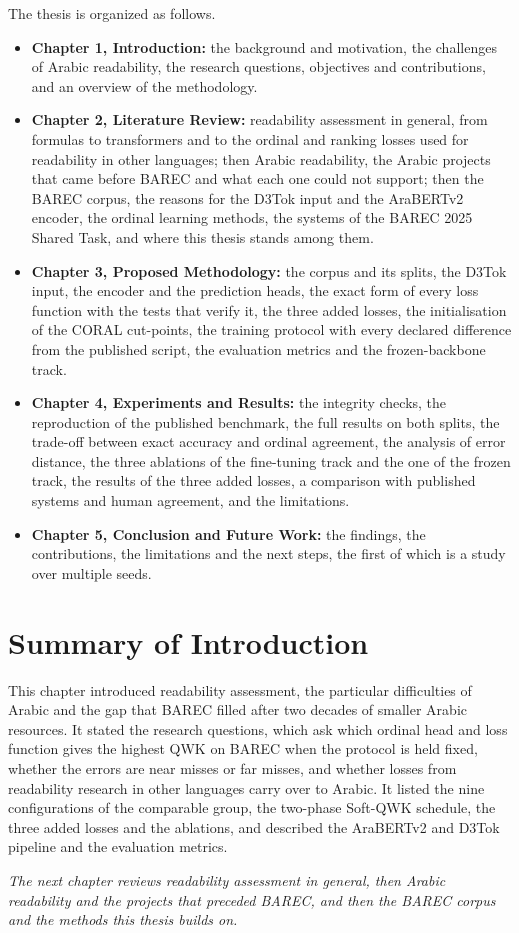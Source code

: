 The thesis is organized as follows.
\begin{itemize}
\item \textbf{Chapter 1, Introduction:} the background and motivation, the challenges of Arabic
readability, the research questions, objectives and contributions, and an overview of the
methodology.
\item \textbf{Chapter 2, Literature Review:} readability assessment in general, from formulas to
transformers and to the ordinal and ranking losses used for readability in other languages;
then Arabic readability, the Arabic projects that came before BAREC and what each one could not
support; then the BAREC corpus, the reasons for the D3Tok input and the AraBERTv2 encoder, the
ordinal learning methods, the systems of the BAREC 2025 Shared Task, and where this thesis
stands among them.
\item \textbf{Chapter 3, Proposed Methodology:} the corpus and its splits, the D3Tok input, the
encoder and the prediction heads, the exact form of every loss function with the tests that
verify it, the three added losses, the initialisation of the CORAL cut-points, the training
protocol with every declared difference from the published script, the evaluation metrics and
the frozen-backbone track.
\item \textbf{Chapter 4, Experiments and Results:} the integrity checks, the reproduction of the
published benchmark, the full results on both splits, the trade-off between exact accuracy and
ordinal agreement, the analysis of error distance, the three ablations of the fine-tuning track
and the one of the frozen track, the results of the three added losses, a comparison with
published systems and human agreement, and the limitations.
\item \textbf{Chapter 5, Conclusion and Future Work:} the findings, the contributions, the
limitations and the next steps, the first of which is a study over multiple seeds.
\end{itemize}

\section{Summary of Introduction}

This chapter introduced readability assessment, the particular difficulties of Arabic and the
gap that BAREC filled after two decades of smaller Arabic resources. It stated the research
questions, which ask which ordinal head and loss function gives the highest QWK on BAREC when the
protocol is held fixed, whether the errors are near misses or far misses, and whether losses
from readability research in other languages carry over to Arabic. It listed the nine
configurations of the comparable group, the two-phase Soft-QWK schedule, the three added losses
and the ablations, and described the AraBERTv2 and D3Tok pipeline and the evaluation metrics.

\textit{The next chapter reviews readability assessment in general, then Arabic readability and
the projects that preceded BAREC, and then the BAREC corpus and the methods this thesis builds
on.}
